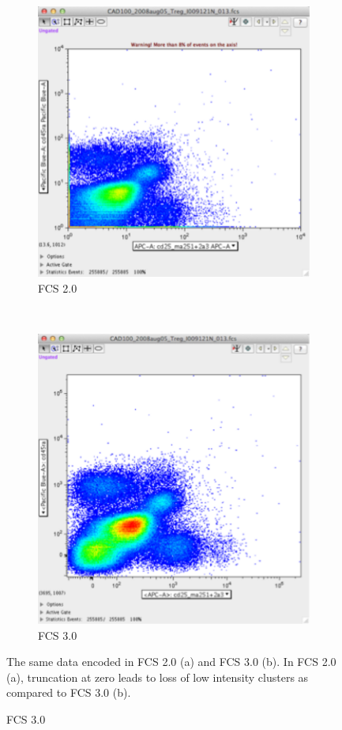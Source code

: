 \begin{figure}[h]
\centering
\begin{subfigure}[b]{.4\textwidth}
    \centering
    \includegraphics[scale=.3]{figures/fcs2.pdf}
    \caption{ FCS 2.0 }
\end{subfigure}
~
\begin{subfigure}[b]{.4\textwidth}
    \centering
    \includegraphics[scale=.3]{figures/fcs3.pdf}
    \caption{ FCS 3.0 }
\end{subfigure} 
  {The same data encoded in FCS 2.0 (a) and FCS 3.0 (b).}
  {
    In FCS 2.0 (a), truncation at zero leads to loss of low intensity clusters as compared to FCS 3.0 (b).
  }
\end{figure}


